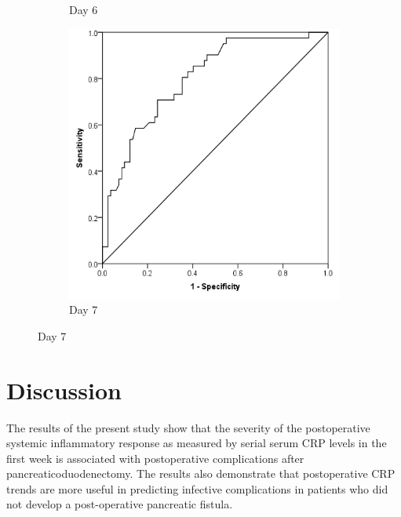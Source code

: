 \begin{figure}[t]
\begin{subfigure}{0.3\textwidth}
		\caption{Day 6}		
		\label{fig:crp_comp_ROC_infection_D6}
	\end{subfigure}
	\begin{subfigure}{0.3\textwidth}
		\centering
		\includegraphics[width=\textwidth]{Figures/crp_comp_ROC_infection_D7}
		\caption{Day 7}
		\label{fig:crp_comp_ROC_infection_D7}
	\end{subfigure}
\end{figure}
\vfill





\clearpage
\section{Discussion}

The results of the present study show that the severity of the postoperative systemic inflammatory response as measured by serial serum CRP levels in the first week is associated with postoperative complications after pancreaticoduodenectomy. 
The results also demonstrate that postoperative CRP trends are more useful in predicting infective complications in patients who did not develop a post-operative pancreatic fistula.

